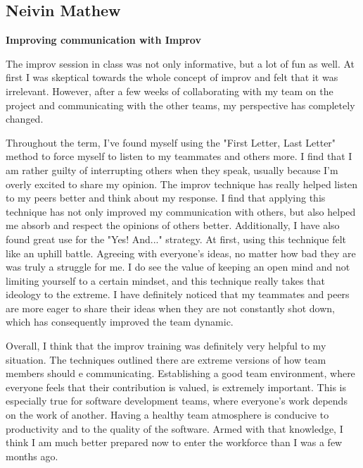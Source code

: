 \documentclass[12pt,letterpaper]{article}
\begin{document}
\subsection{Neivin Mathew}
\textbf{Improving communication with Improv}\par
The improv session in class was not only informative, but a lot of fun as well. At first I was skeptical towards the whole concept of improv and felt that it was irrelevant. However, after a few weeks of collaborating with my team on the project and communicating with the other teams, my perspective has completely changed. \par
	Throughout the term, I've found myself using the "First Letter, Last Letter" method to force myself to listen to my teammates and others more. I find that I am rather guilty of interrupting others when they speak, usually because I'm overly excited to share my opinion. The improv technique has really helped listen to my peers better and think about my response. I find that applying this technique has not only improved my communication with others, but also helped me absorb and respect the opinions of others better. Additionally, I have also found great use for the "Yes! And..." strategy. At first, using this technique felt like an uphill battle. Agreeing with everyone's ideas, no matter how bad they are was truly a struggle for me. I do see the value of keeping an open mind and not limiting yourself to a certain mindset, and this technique really takes that ideology to the extreme. I have definitely noticed that my teammates and peers are more eager to share their ideas when they are not constantly shot down, which has consequently improved the team dynamic.\par
	Overall, I think that the improv training was definitely very helpful to my situation. The techniques outlined there are extreme versions of how team members should e communicating. Establishing a good team environment, where everyone feels that their contribution is valued, is extremely important. This is especially true for software development teams, where everyone's work depends on the work of another. Having a healthy  team atmosphere is conducive to productivity and to the quality of the software. Armed with that knowledge, I think I am much better prepared now to enter the workforce than I was a few months ago.
		
	
\clearpage
\end{document}
